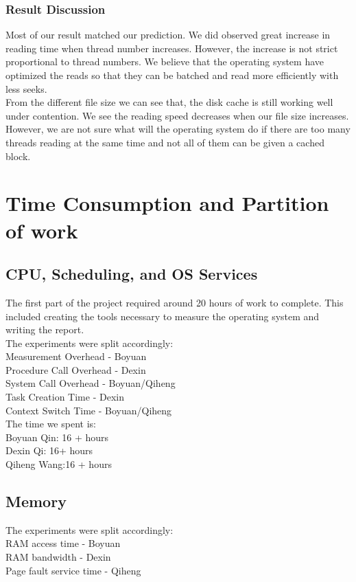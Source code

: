 \documentclass{article} %
\begin{document}
\subsubsection{Result Discussion}
Most of our result matched our prediction. We did observed great increase in reading time when thread number increases. However, the increase is not strict proportional to thread numbers. We believe that the operating system have optimized the reads so that they can be batched and read more efficiently with less seeks. \\
From the different file size we can see that, the disk cache is still working well under contention. We see the reading speed decreases when our file size increases. However, we are not sure what will the operating system do if there are too many threads reading at the same time and not all of them can be given a cached block. \\

\section{Time Consumption and Partition of work}
\subsection{CPU, Scheduling, and OS Services}
The first part of the project required around 20 hours of work to complete. This included creating the tools necessary to measure the operating system and writing the report.\\
The experiments were split accordingly:\\
Measurement Overhead - Boyuan\\
Procedure Call Overhead - Dexin\\
System Call Overhead - Boyuan/Qiheng\\
Task Creation Time - Dexin\\
Context Switch Time - Boyuan/Qiheng\\

The time we spent is:\\
Boyuan Qin: 16 + hours\\
Dexin Qi: 16+ hours\\
Qiheng Wang:16 + hours

\subsection{Memory}
The experiments were split accordingly:\\
RAM access time - Boyuan\\
RAM bandwidth - Dexin\\
Page fault service time - Qiheng\\
\end{document}
